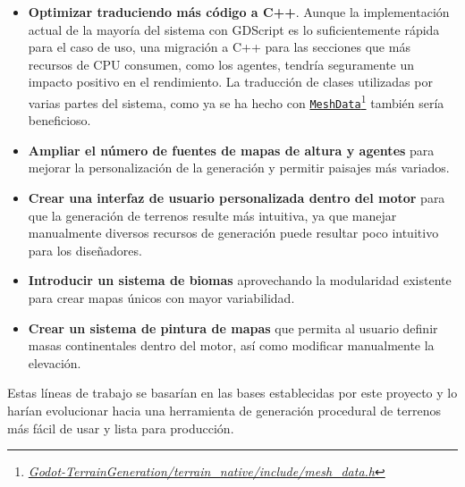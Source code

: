 \begin{itemize}
    \item \textbf{Optimizar traduciendo más código a C++}. Aunque la implementación actual de la mayoría del sistema con GDScript es lo suficientemente rápida para el caso de uso, una migración a C++ para las secciones que más recursos de CPU consumen, como los agentes, tendría seguramente un impacto positivo en el rendimiento.
    La traducción de clases utilizadas por varias partes del sistema, como ya se ha hecho con \href{{https://github.com/fsande/TFG---Eric-Rios/blob/main/Godot-TerrainGeneration/terrain_native/include/mesh_data.h}}{\texttt{MeshData}}\footnote{\href{{https://github.com/fsande/TFG---Eric-Rios/blob/main/Godot-TerrainGeneration/terrain_native/include/mesh_data.h}}{\textit{Godot-TerrainGeneration/terrain\_native/include/mesh\_data.h}}} también sería beneficioso.

    \item \textbf{Ampliar el número de fuentes de mapas de altura y agentes} para mejorar la personalización de la generación y permitir paisajes más variados.

    \item \textbf{Crear una interfaz de usuario personalizada dentro del motor} para que la generación de terrenos resulte más intuitiva, ya que manejar manualmente diversos recursos de generación puede resultar poco intuitivo para los diseñadores.
    
    \item \textbf{Introducir un sistema de biomas} aprovechando la modularidad existente para crear mapas únicos con mayor variabilidad.

    \item \textbf{Crear un sistema de pintura de mapas} que permita al usuario definir masas continentales dentro del motor, así como modificar manualmente la elevación.
\end{itemize}

Estas líneas de trabajo se basarían en las bases establecidas por este proyecto y lo harían evolucionar hacia una herramienta de generación procedural de terrenos más fácil de usar y lista para producción.